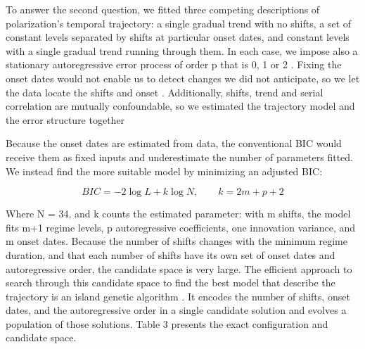 To answer the second question, we fitted three competing descriptions of polarization's temporal trajectory: a single gradual trend with no shifts, a set of constant levels separated by shifts at particular onset dates, and constant levels with a single gradual trend running through them. In each case, we impose also a stationary autoregressive error process of order p that is 0, 1 or 2 \citep{beaulieuDistinguishingTrendsShifts2018}. Fixing the onset dates would not enable us to detect changes we did not anticipate, so we let the data locate the shifts and onset \citep{baiEstimatingTestingLinear1998a}. Additionally, shifts, trend and serial correlation are mutually confoundable, so we estimated the trajectory model and the error structure together \citep{lundGoodPracticesCommon2023}

Because the onset dates are estimated from data, the conventional BIC would receive them as fixed inputs and underestimate the number of parameters fitted. We instead find the more suitable model by minimizing an adjusted BIC:

\[BIC=-2\log L+k\log N,\quad\quad k = 2m+p+2\]

Where N = 34, and k counts the estimated parameter: with m shifts, the model fits m+1 regime levels, p autoregressive coefficients, one innovation variance, and m onset dates. Because the number of shifts changes with the minimum regime duration, and that each number of shifts have its own set of onset dates and autoregressive order, the candidate space is very large. The efficient approach to search through this candidate space to find the best model that describe the trajectory is an island genetic algorithm \citep{liChangepointGAPackageFast2026}. It encodes the number of shifts, onset dates, and the autoregressive order in a single candidate solution and evolves a population of those solutions. Table 3 presents the exact configuration and candidate space.



